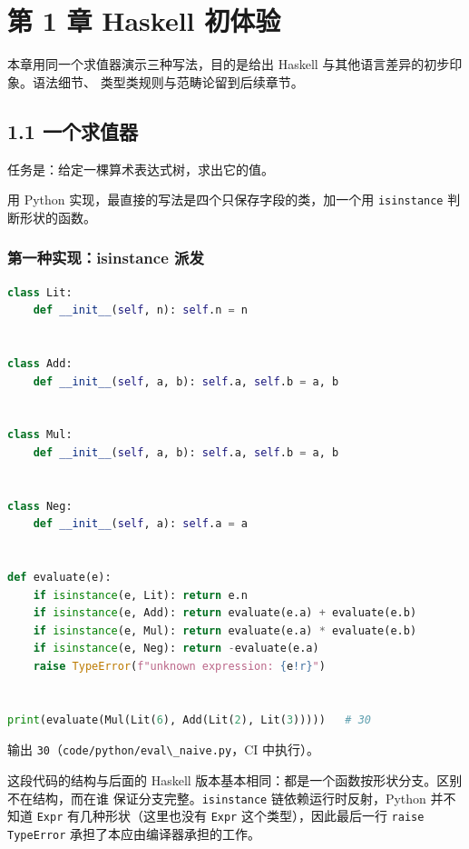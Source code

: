 \chapter{第 1 章 Haskell 初体验}\label{ux7b2c-1-ux7ae0-haskell-ux521dux4f53ux9a8c}

本章用同一个求值器演示三种写法，目的是给出 Haskell 与其他语言差异的初步印象。语法细节、
类型类规则与范畴论留到后续章节。

\section{1.1 一个求值器}\label{ux4e00ux4e2aux6c42ux503cux5668}

任务是：给定一棵算术表达式树，求出它的值。

用 Python 实现，最直接的写法是四个只保存字段的类，加一个用 \passthrough{\lstinline!isinstance!} 判断形状的函数。

\subsection{第一种实现：isinstance 派发}\label{ux7b2cux4e00ux79cdux5b9eux73b0isinstance-ux6d3eux53d1}

\begin{lstlisting}[language=Python]
class Lit:
    def __init__(self, n): self.n = n


class Add:
    def __init__(self, a, b): self.a, self.b = a, b


class Mul:
    def __init__(self, a, b): self.a, self.b = a, b


class Neg:
    def __init__(self, a): self.a = a


def evaluate(e):
    if isinstance(e, Lit): return e.n
    if isinstance(e, Add): return evaluate(e.a) + evaluate(e.b)
    if isinstance(e, Mul): return evaluate(e.a) * evaluate(e.b)
    if isinstance(e, Neg): return -evaluate(e.a)
    raise TypeError(f"unknown expression: {e!r}")


print(evaluate(Mul(Lit(6), Add(Lit(2), Lit(3)))))   # 30
\end{lstlisting}

输出 \passthrough{\lstinline!30!}（\passthrough{\lstinline!code/python/eval\_naive.py!}，CI 中执行）。

这段代码的结构与后面的 Haskell 版本基本相同：都是一个函数按形状分支。区别不在结构，而在谁
保证分支完整。\passthrough{\lstinline!isinstance!} 链依赖运行时反射，Python 并不知道 \passthrough{\lstinline!Expr!} 有几种形状（这里也没有
\passthrough{\lstinline!Expr!} 这个类型），因此最后一行 \passthrough{\lstinline!raise TypeError!} 承担了本应由编译器承担的工作。

